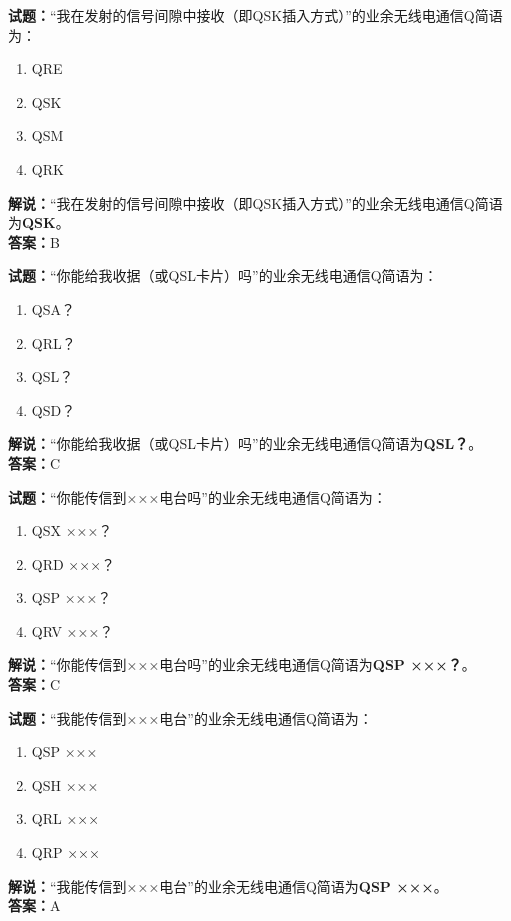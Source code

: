 \documentclass{ctexbook}
\begin{document}
\vspace{1em}

\textbf{试题：}“我在发射的信号间隙中接收（即QSK插入方式）”的业余无线电通信Q简语为：
\begin{enumerate}[leftmargin=3em]
  \item QRE
  \item QSK
  \item QSM
  \item QRK
\end{enumerate}
\noindent\textbf{解说：}“我在发射的信号间隙中接收（即QSK插入方式）”的业余无线电通信Q简语为\textbf{QSK}。\\\noindent\textbf{答案：}B

\vspace{1em}

\textbf{试题：}“你能给我收据（或QSL卡片）吗”的业余无线电通信Q简语为：
\begin{enumerate}[leftmargin=3em]
  \item QSA？
  \item QRL？
  \item QSL？
  \item QSD？
\end{enumerate}
\noindent\textbf{解说：}“你能给我收据（或QSL卡片）吗”的业余无线电通信Q简语为\textbf{QSL？}。\\\noindent\textbf{答案：}C

\vspace{1em}

\textbf{试题：}“你能传信到×××电台吗”的业余无线电通信Q简语为：
\begin{enumerate}[leftmargin=3em]
  \item QSX ×××？
  \item QRD ×××？
  \item QSP ×××？
  \item QRV ×××？
\end{enumerate}
\noindent\textbf{解说：}“你能传信到×××电台吗”的业余无线电通信Q简语为\textbf{QSP ×××？}。\\\noindent\textbf{答案：}C

\vspace{1em}

\textbf{试题：}“我能传信到×××电台”的业余无线电通信Q简语为：
\begin{enumerate}[leftmargin=3em]
  \item QSP ×××
  \item QSH ×××
  \item QRL ×××
  \item QRP ×××
\end{enumerate}
\noindent\textbf{解说：}“我能传信到×××电台”的业余无线电通信Q简语为\textbf{QSP ×××}。\\\noindent\textbf{答案：}A
\end{document}
